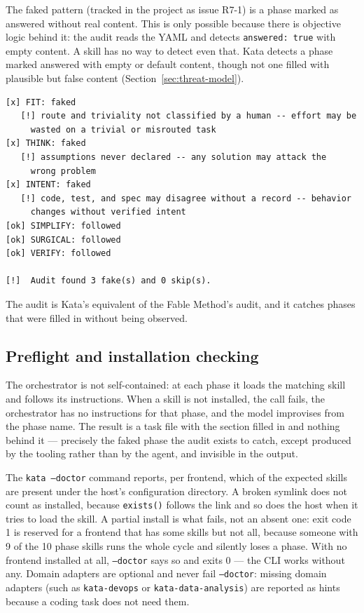 \documentclass[11pt]{article}
\begin{document}
The faked pattern (tracked in the project as issue R7-1) is a phase
marked as answered without real content. This is only possible because
there is objective logic behind it:
the audit reads the YAML and detects \texttt{answered: true} with empty
content. A skill has no way to detect even that. Kata detects a phase marked
answered with empty or default content, though not one filled with plausible
but false content (Section~\ref{sec:threat-model}).

\begin{lstlisting}
[x] FIT: faked
   [!] route and triviality not classified by a human -- effort may be
     wasted on a trivial or misrouted task
[x] THINK: faked
   [!] assumptions never declared -- any solution may attack the
     wrong problem
[x] INTENT: faked
   [!] code, test, and spec may disagree without a record -- behavior
     changes without verified intent
[ok] SIMPLIFY: followed
[ok] SURGICAL: followed
[ok] VERIFY: followed

[!]  Audit found 3 fake(s) and 0 skip(s).
\end{lstlisting}

The audit is Kata's equivalent of the Fable Method's audit, and it
catches phases that were filled in without being observed.

\subsection{Preflight and installation checking}

The orchestrator is not self-contained: at each phase it loads the matching
skill and follows its instructions. When a skill is not installed, the call
fails, the orchestrator has no instructions for that phase, and the model
improvises from the phase name. The result is a task file with the section
filled in and nothing behind it --- precisely the faked phase the audit
exists to catch, except produced by the tooling rather than by the agent,
and invisible in the output.

The \texttt{kata --doctor} command reports, per frontend, which of the
expected skills are present under the host's configuration directory. A
broken symlink does not count as installed, because \texttt{exists()}
follows the link and so does the host when it tries to load the skill. A
partial install is what fails, not an absent one: exit code 1 is reserved
for a frontend that has some skills but not all, because someone with 9 of
the 10 phase skills runs the whole cycle and silently loses a phase. With
no frontend installed at all, \texttt{--doctor} says so and exits 0 --- the
CLI works without any. Domain adapters are optional and never fail
\texttt{--doctor}: missing domain adapters (such as \texttt{kata-devops} or
\texttt{kata-data-analysis}) are reported as hints because a coding task
does not need them.
\end{document}
